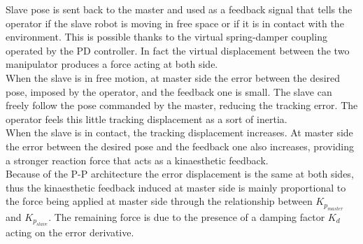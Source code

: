 Slave pose is sent back to the master and used as a feedback signal that tells the operator if the slave robot is moving in free space or if it is in contact with the environment. This is possible thanks to the virtual spring-damper coupling operated by the PD controller.
In fact the virtual displacement between the two manipulator produces a force acting at both side.\\
When the slave is in free motion, at master side the error between the desired pose, imposed by the operator, and the feedback one is small. The slave can freely follow the pose commanded by the master, reducing the tracking error. The operator feels this little tracking displacement as a sort of inertia.\\
When the slave is in contact, the tracking displacement increases. At master side the error between the desired pose and the feedback one also increases, providing a stronger reaction force that acts as a kinaesthetic feedback.\\
Because of the P-P architecture the error displacement is the same at both sides, thus the kinaesthetic feedback induced at master side is mainly proportional to the force being applied at master side through the relationship between $K_{p_{master}} $ and $K_{p_{slave}}$.
The remaining force is due to the presence of a damping factor $K_{d}$ acting on the error derivative.

